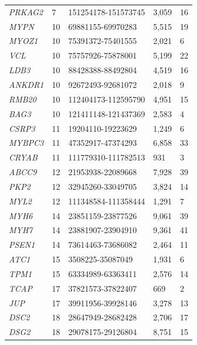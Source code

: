 \begin{table}[H]
\begin{minipage}{\textwidth}
{\begin{tabulary}{\linewidth}{p{1cm}p{1.3cm}p{2.7cm}p{2cm}p{2cm}}
		\rule{0pt}{1ex} \textsl{PRKAG2} & 7 & 151254178-151573745 & 3,059 & 16 \\
		\rule{0pt}{1ex} \textsl{MYPN} & 10 & 69881155-69970283 & 5,515 & 19 \\
		\rule{0pt}{1ex} \textsl{MYOZ1} & 10 & 75391372-75401555 & 2,021 & 6 \\
		\rule{0pt}{1ex} \textsl{VCL} & 10 & 75757926-75878001 & 5,199 & 22 \\
		\rule{0pt}{1ex} \textsl{LDB3} & 10 & 88428388-88492804 & 4,519 & 16 \\
		\rule{0pt}{1ex} \textsl{ANKDR1} & 10 & 92672493-92681072 & 2,018 & 9 \\
		\rule{0pt}{1ex} \textsl{RMB20} & 10 & 112404173-112595790 & 4,951 & 15 \\
		\rule{0pt}{1ex} \textsl{BAG3} & 10 & 121411148-121437369 & 2,583 & 4 \\
		\rule{0pt}{1ex} \textsl{CSRP3} & 11 & 19204110-19223629 & 1,249 & 6 \\
		\rule{0pt}{1ex} \textsl{MYBPC3} & 11 & 47352917-47374293 & 6,858 & 33 \\
		\rule{0pt}{1ex} \textsl{CRYAB} & 11 & 111779310-111782513 & 931 & 3 \\
		\rule{0pt}{1ex} \textsl{ABCC9} & 12 & 21953938-22089668 & 7,928 & 39 \\
		\rule{0pt}{1ex} \textsl{PKP2} & 12 & 32945260-33049705 & 3,824 & 14 \\
		\rule{0pt}{1ex} \textsl{MYL2} & 12 & 111348584-111358444 & 1,291 & 7 \\
		\rule{0pt}{1ex} \textsl{MYH6} & 14 & 23851159-23877526 & 9,061 & 39 \\
		\rule{0pt}{1ex} \textsl{MYH7} & 14 & 23881907-23904910 & 9,361 & 41 \\
		\rule{0pt}{1ex} \textsl{PSEN1} & 14 & 73614463-73686082 & 2,464 & 11 \\
		\rule{0pt}{1ex} \textsl{ATC1} & 15 & 3508225-35087049 & 1,931 & 6 \\
		\rule{0pt}{1ex} \textsl{TPM1} & 15 & 63334989-63363411 & 2,576 & 14 \\
		\rule{0pt}{1ex} \textsl{TCAP} & 17 & 37821573-37822407 & 669 & 2 \\
		\rule{0pt}{1ex} \textsl{JUP} & 17 & 39911956-39928146 & 3,278 & 13 \\
		\rule{0pt}{1ex} \textsl{DSC2} & 18 & 28647949-28682428 & 2,706 & 17 \\
		\rule{0pt}{1ex} \textsl{DSG2} & 18 & 29078175-29126804 & 8,751 & 15 \\

\end{tabulary}}
\end{minipage}
\end{table}
